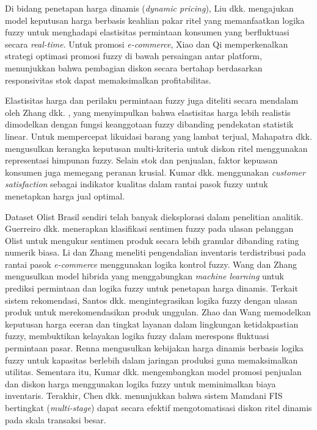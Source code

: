 \documentclass[conference]{IEEEtran}
\begin{document}
Di bidang penetapan harga dinamis (\textit{dynamic pricing}), Liu dkk. \cite{liu2022} mengajukan model keputusan harga berbasis keahlian pakar ritel yang memanfaatkan logika fuzzy untuk menghadapi elastisitas permintaan konsumen yang berfluktuasi secara \textit{real-time}. Untuk promosi \textit{e-commerce}, Xiao dan Qi \cite{xiao2023} memperkenalkan strategi optimasi promosi fuzzy di bawah persaingan antar platform, menunjukkan bahwa pembagian diskon secara bertahap berdasarkan responsivitas stok dapat memaksimalkan profitabilitas.

Elastisitas harga dan perilaku permintaan fuzzy juga diteliti secara mendalam oleh Zhang dkk. \cite{zhang2023}, yang menyimpulkan bahwa elastisitas harga lebih realistis dimodelkan dengan fungsi keanggotaan fuzzy dibanding pendekatan statistik linear. Untuk mempercepat likuidasi barang yang lambat terjual, Mahapatra dkk. \cite{mahapatra2024} mengusulkan kerangka keputusan multi-kriteria untuk diskon ritel menggunakan representasi himpunan fuzzy. Selain stok dan penjualan, faktor kepuasan konsumen juga memegang peranan krusial. Kumar dkk. \cite{kumar2022} menggunakan \textit{customer satisfaction} sebagai indikator kualitas dalam rantai pasok fuzzy untuk menetapkan harga jual optimal.

Dataset Olist Brasil sendiri telah banyak dieksplorasi dalam penelitian analitik. Guerreiro dkk. \cite{guerreiro2021} menerapkan klasifikasi sentimen fuzzy pada ulasan pelanggan Olist untuk mengukur sentimen produk secara lebih granular dibanding rating numerik biasa. Li dan Zhang \cite{lizhang2024} meneliti pengendalian inventaris terdistribusi pada rantai pasok \textit{e-commerce} menggunakan logika kontrol fuzzy. Wang dan Zhang \cite{wang2025} mengusulkan model hibrida yang menggabungkan \textit{machine learning} untuk prediksi permintaan dan logika fuzzy untuk penetapan harga dinamis. Terkait sistem rekomendasi, Santos dkk. \cite{santos2023} mengintegrasikan logika fuzzy dengan ulasan produk untuk merekomendasikan produk unggulan. Zhao dan Wang \cite{zhao2015} memodelkan keputusan harga eceran dan tingkat layanan dalam lingkungan ketidakpastian fuzzy, membuktikan kelayakan logika fuzzy dalam merespons fluktuasi permintaan pasar. Renna \cite{renna2015} mengusulkan kebijakan harga dinamis berbasis logika fuzzy untuk kapasitas berlebih dalam jaringan produksi guna memaksimalkan utilitas. Sementara itu, Kumar dkk. \cite{kumar2016} mengembangkan model promosi penjualan dan diskon harga menggunakan logika fuzzy untuk meminimalkan biaya inventaris. Terakhir, Chen dkk. \cite{chen2026} menunjukkan bahwa sistem Mamdani FIS bertingkat (\textit{multi-stage}) dapat secara efektif mengotomatisasi diskon ritel dinamis pada skala transaksi besar.
\end{document}
